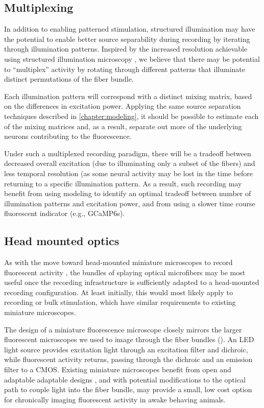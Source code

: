 \subsection{Multiplexing}

In addition to enabling patterned stimulation, 
structured illumination may have the potential 
to enable better source separability during 
recording by iterating through illumination 
patterns. Inspired by the increased resolution 
achievable using structured illumination 
microscopy
\cite{Gustafsson:2000wj,Gustafsson:2005hg,Saxena:2015fm},
we believe that there may be potential 
to ``multiplex'' activity by rotating through 
different patterns that illuminate distinct 
permutations of the fiber bundle. 

Each illumination pattern will correspond with a 
distinct mixing matrix, based on the differences 
in excitation power. Applying the same source 
separation techniques described in 
\cref{chapter:modeling}, it should be possible 
to estimate each of the mixing matrices and, as 
a result, separate out more of the underlying 
neurons contributing to the fluorescence.

Under such a multiplexed recording paradigm, there 
will be a tradeoff between decreased overall 
excitation (due to illuminating only a subset of the 
fibers) and less temporal resolution (as some 
neural activity may be lost in the time before 
returning to a specific illumination pattern. 
As a result, such recording may benefit from using 
modeling to identify an optimal tradeoff between 
number of illumination patterns and excitation 
power, and from using a slower time course 
fluorescent indicator (e.g., GCaMP6s).

\subsection{Head mounted optics}

As with the move toward head-mounted miniature 
microscopes to record fluorescent activity 
\cite{Ghosh:2011ee,Cai:2016hm,LibertiIII:2017df}, 
the bundles of splaying optical microfibers may 
be most useful once the recording infrastructure 
is sufficiently adapted to a head-mounted 
recording configuration. At least initially, this 
would most likely apply to recording or bulk 
stimulation, which have similar requirements to 
existing miniature microscopes. 

The design of a miniature fluorescence microscope 
closely mirrors the larger fluorescent microscopes 
we used to image through the fiber bundles 
(). An LED light source 
provides excitation light through an excitation 
filter and dichroic, while fluorescent activity 
returns, passing through the dichroic and an 
emission filter to a CMOS. Existing miniature 
microscopes benefit from open and adaptable 
adaptable designs \cite{Cai:2016hm,LibertiIII:2017df},
and with potential modifications to the optical 
path to couple light into the fiber bundle, 
may provide a small, low cost option for 
chronically imaging fluorescent activity in awake
behaving animals.

